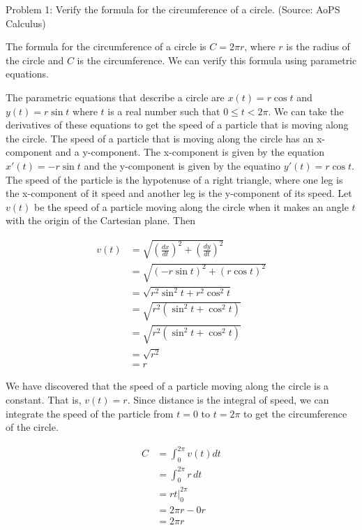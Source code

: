 Problem 1: Verify the formula for the circumference of a circle. (Source: AoPS Calculus)

The formula for the circumference of a circle is $C = 2\pi r$, where $r$ is the radius of the circle and $C$ is the circumference. We can verify this formula using parametric equations.

The parametric equations that describe a circle are $x(t) = r\cos t$ and $y(t) = r\sin t$ where $t$ is a real number such that $0 \leq t < 2 \pi$. We can take the derivatives of these equations to get the speed of a particle that is moving along the circle. The speed of a particle that is moving along the circle has an x-component and a y-component. The x-component is given by the equation $x'(t) = -r\sin t$ and the y-component is given by the equatino $y'(t) = r\cos t$. The speed of the particle is the hypotenuse of a right triangle, where one leg is the x-component of it speed and another leg is the y-component of its speed. Let $v(t)$ be the speed of a particle moving along the circle when it makes an angle $t$ with the origin of the Cartesian plane. Then

\begin{align*}
v(t) &= \sqrt{\left(\frac{dx}{dt}\right)^2 + \left(\frac{dy}{dt}\right)^2} \\
&= \sqrt{\left(-r\sin t\right)^2 + \left(r\cos t\right)^2} \\
&= \sqrt{r^2\sin^2 t + r^2 \cos^2 t} \\
&= \sqrt{r^2(\sin^2 t + \cos^2 t)} \\
&= \sqrt{r^2(\sin^2 t + \cos^2 t)} \\
&= \sqrt{r^2} \\
&= r
\end{align*}

We have discovered that the speed of a particle moving along the circle is a constant. That is, $v(t) = r$. Since distance is the integral of speed, we can integrate the speed of the particle from $t = 0$ to $t = 2\pi$ to get the circumference of the circle.

\begin{align*}
C &= \int_{0}^{2\pi} v(t) dt \\
&= \int_{0}^{2\pi} r \, dt \\
&= rt \Bigg|_{0}^{2\pi} \\
&= 2\pi r - 0r \\
&= \boxed{2\pi r}
\end{align*}

